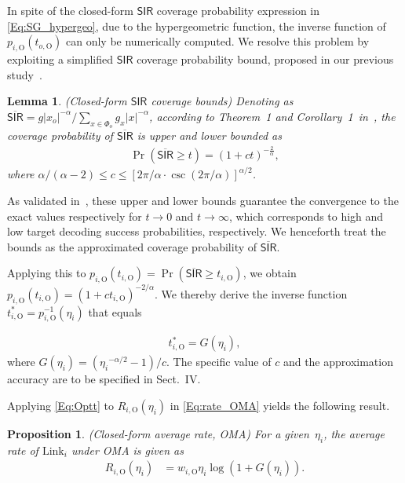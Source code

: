 \documentclass[conference]{IEEEtran}
\newtheorem{lemma}{Lemma}
\newtheorem{proposition}{Proposition}
\def\SIR{\mathsf{SIR}}
\def\({\left(}
\def\){\right)}
\def\[{\left[}
\def\]{\right]}
\def\SIRn{\widetilde{\SIR}}
\def\OMA{\text{O}}
\def\L{\text{Link}}
\def\SIRn{\overline{\SIR}}
\def\thmspacing{1.1}
\begin{document}
In spite of the closed-form $\SIR$ coverage probability expression in \eqref{Eq:SG_hypergeo}, due to the hypergeometric function, the inverse function of $p_{i,\OMA}(t_{o,\OMA})$ can only be numerically computed. We resolve this problem by exploiting a simplified $\SIR$ coverage probability bound, proposed in our previous study~\cite{RelCovWCL:17}.
\begin{lemma} \linespread{\thmspacing} (Closed-form $\SIR$ coverage bounds) \emph{Denoting as $\SIRn= g|x_o|^{-\alpha}/\sum_{x\in\Phi_o}g_x |x|^{-\alpha}$, according to Theorem~1 and Corollary~1~in~\cite{RelCovWCL:17}, the coverage probability of $\SIRn$ is upper and lower bounded as
\small\begin{align}
\Pr(\SIRn\geq t) = (1 + c t)^{-\frac{2}{\alpha}},
\end{align}\normalsize
where ${\alpha}/{(\alpha-2)} \leq c \leq \[{2\pi}/{\alpha}\cdot \csc\({2\pi}/{\alpha}\)\]^{{\alpha}/{2}}$.
}\end{lemma}
\noindent  As validated in~\cite{RelCovWCL:17}, these upper and lower bounds guarantee the convergence to the exact values respectively for $t\rightarrow 0$ and $t\rightarrow \infty$, which corresponds to high and low target decoding success probabilities, respectively. We henceforth treat the bounds as the approximated coverage probability of $\SIRn$.

Applying this to $p_{i,\OMA}(t_{i,\OMA})=\Pr(\SIRn \geq t_{i,\OMA})$, we obtain $p_{i,\OMA}(t_{i,\OMA})=(1+c  t_{i,\OMA})^{-2/\alpha}$. We thereby derive the inverse function $t_{i,\OMA}^*=p_{i,\OMA}^{-1}(\eta_i)$ that equals

\vspace{-10pt}\small\begin{align}
t_{i,\OMA}^* = G(\eta_i), \label{Eq:Optt}
\end{align}\normalsize
where $G(\eta_i)=({\eta_i}^{-\alpha/2}-1)/c$. The specific value of $c$ and the approximation accuracy are to be specified in Sect.~IV.


Applying \eqref{Eq:Optt} to $R_{i,\OMA}(\eta_i)$ in \eqref{Eq:rate_OMA} yields the following result.
\begin{proposition}\linespread{\thmspacing} (Closed-form average rate, OMA) \emph{For a given~$\eta_i$, the average rate of $\L_i$ under OMA is given as
\small\begin{align}
R_{i,\OMA}(\eta_i) &= w_{i,\OMA} \eta_i  \log\(1 + {G(\eta_i)} \).
\end{align}\normalsize
}\end{proposition}
\end{document}
